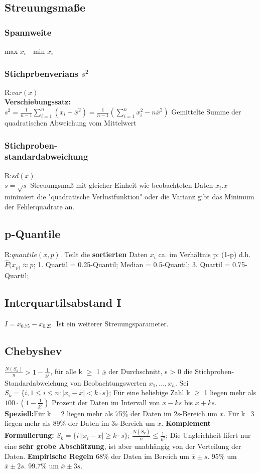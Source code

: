   \subsection{Streuungsmaße}
    \subsubsection{Spannweite}
    max $x_{i}$ - min $x_{i}$
    \subsubsection{Stichprbenverians $s^2$}
    R:$var(x)$\\
    \textbf{Verschiebungssatz:}\\
      $s^2 = \frac{1}{n-1} \sum_{i=1}^{n}(x_{i} - \overline{x}^2) = \frac{1}{n-1} (\sum_{i=1}^{n} x_{i}^2 - n\overline{x}^2)$
      Gemittelte Summe der quadratischen Abweichung vom Mittelwert
      \subsubsection{Stichproben-\\standardabweichung}
      R:$sd(x)$\\
      $s=\sqrt{s}$
      Streuungsmaß mit gleicher Einheit wie beobachteten Daten $x_{i}$.$ \overline{x}$ minimiert die "quadratische Verlustfunktion" oder die Varianz gibt das Minimum der Fehlerquadrate an.
      \subsection{p-Quantile}
      R:$quantile(x,p)$. Teilt die \textbf{sortierten} Daten $x_{i}$ ca. im Verhältnis p: (1-p) d.h. $\hat{F}(x_{p)} \approx p$;
      1. Quartil = 0.25-Quantil; 
      Median = 0.5-Quantil; 
      3. Quartil = 0.75-Quartil; 
      \subsection{Interquartilsabstand I}
      $I = x_{0.75} - x_{0.25}$. Ist ein weiterer Streuungsparameter.
      \subsection{Chebyshev}
      $\frac{N(S_{k})}{n} > 1-\frac{1}{k^2}$, für alle k $\geq$ 1
      $\overline{x}$ der Durchschnitt, s > 0 die Stichproben-Standardabweichung von Beobachtungswerten $x_{1}, ..., x_{n}$. Sei $S_{k} = \{i, 1 \leq i \leq n: |x_{i} - \overline{x}| < k \cdot s\}$; Für eine beliebige Zahl k $\geq$ 1 liegen mehr als $100 \cdot (1-\frac{1}{k^2})$ Prozent der Daten im Intervall von $\overline{x} - ks$ bis $ \overline{x} + ks$. \textbf{Speziell:}Für k = 2 liegen mehr als 75\% der Daten im 2s-Bereich um $\overline{x}$. Für k=3 liegen mehr als 89\% der Daten im 3s-Bereich um $\overline{x}$. \textbf{Komplement Formulierung:} $\overline{S}_{k} = \{i | |x_{i}-\overline{x}| \geq k \cdot s\}$; 
      $\frac{N(\overline{S}_{k})}{n} \leq \frac{1}{k^2}$; Die Ungleichheit lifert nur eine \textbf{sehr grobe Abschätzung}, ist aber unabhängig von der Verteilung der Daten. \textbf{Empirische Regeln} 68\% der Daten im Bereich um $\overline{x} \pm s$. 95\% um $\overline{x} \pm 2s$. 99.7\% um $\overline{x} \pm3s$.

